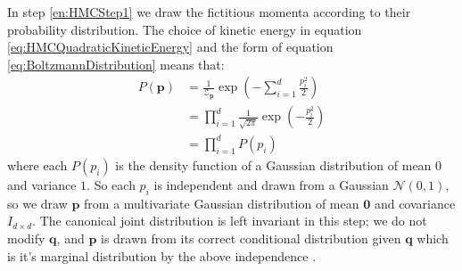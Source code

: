 \documentclass[12pt]{article}
\begin{document}
            In step \ref{en:HMCStep1} we draw the fictitious momenta according to their probability distribution. The choice of kinetic energy in equation \ref{eq:HMCQuadraticKineticEnergy} and the form of equation \ref{eq:BoltzmannDistribution} means that:
            \begin{align}
                \label{eq:KineticBoltzmannDistribution}
                P\left(\bm{p}\right) & = \frac{1}{\mathcal{Z}_{\bm{p}}}\exp{\left(-\sum_{i=1}^{d}\frac{p_i^2}{2}\right)} \\
                                     & = \prod_{i=1}^d\frac{1}{\sqrt{2\pi}} \exp{\left(-\frac{p_i^2}{2}\right)} \\
                                     & = \prod_{i=1}^dP\left(p_i\right)
            \end{align}
            where each $P\left(p_i\right)$ is the density function of a Gaussian distribution of mean $0$ and variance $1$. So each $p_i$ is independent and drawn from a Gaussian $\mathcal{N}{\left(0,1\right)}$, so we draw $\bm{p}$ from a multivariate Gaussian distribution of mean $\bm{0}$ and covariance $I_{d\times d}$. The canonical joint distribution is left invariant in this step; we do not modify $\bm{q}$, and $\bm{p}$ is drawn from its correct conditional distribution given $\bm{q}$ which is it's marginal distribution by the above independence \cite{neal_2011}.
\end{document}
